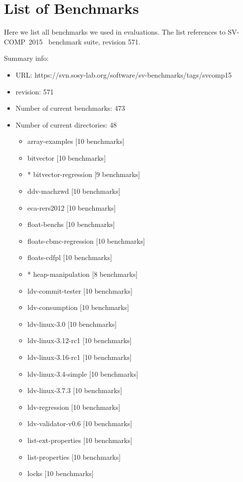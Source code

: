 \documentclass[envcountsame]{llncs}
\begin{document}
\section{List of Benchmarks}
\label{sec:BenchList}

Here we list all benchmarks we used in evaluations. The list references to
SV-COMP~2015~\cite{SVCOMPURL} benchmark suite, revision 571.

\noindent
Summary info:
\begin{itemize}
\item URL: https://svn.sosy-lab.org/software/sv-benchmarks/tags/svcomp15
\item revision: 571
\item Number of current benchmarks: 473
\item Number of current directories: 48
\begin{itemize}
\item     array-examples [10 benchmarks]
\item     bitvector [10 benchmarks]
\item   * bitvector-regression [9 benchmarks]
\item     ddv-machzwd [10 benchmarks]
\item     eca-rers2012 [10 benchmarks]
\item     float-benchs [10 benchmarks]
\item     floats-cbmc-regression [10 benchmarks]
\item     floats-cdfpl [10 benchmarks]
\item   * heap-manipulation [8 benchmarks]
\item     ldv-commit-tester [10 benchmarks]
\item     ldv-consumption [10 benchmarks]
\item     ldv-linux-3.0 [10 benchmarks]
\item     ldv-linux-3.12-rc1 [10 benchmarks]
\item     ldv-linux-3.16-rc1 [10 benchmarks]
\item     ldv-linux-3.4-simple [10 benchmarks]
\item     ldv-linux-3.7.3 [10 benchmarks]
\item     ldv-regression [10 benchmarks]
\item     ldv-validator-v0.6 [10 benchmarks]
\item     list-ext-properties [10 benchmarks]
\item     list-properties [10 benchmarks]
\item     locks [10 benchmarks]

\end{itemize}
\end{itemize}
\end{document}

